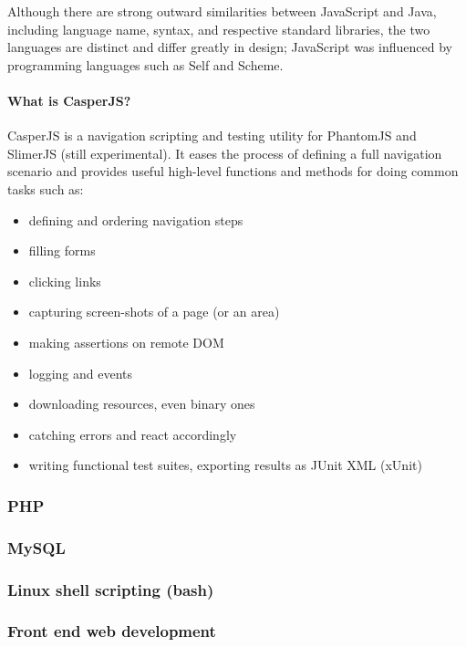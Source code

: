 \documentclass{article}
\begin{document}
Although there are strong outward similarities between JavaScript and Java, including language name, syntax, and respective standard libraries, the two languages are distinct and differ greatly in design; JavaScript was influenced by programming languages such as Self and Scheme.
	
\paragraph{What is CasperJS?}
CasperJS is a navigation scripting and testing utility for PhantomJS and SlimerJS (still experimental). It eases the process of defining a full navigation scenario and provides useful high-level functions and methods for doing common tasks such as:
\begin{itemize}
	\item defining and ordering navigation steps
	\item filling forms
	\item clicking links
	\item capturing screen-shots of a page (or an area)
	\item making assertions on remote DOM		
	\item logging and events
	\item downloading resources, even binary ones
	\item catching errors and react accordingly
	\item writing functional test suites, exporting results as JUnit XML (xUnit)
\end{itemize}
\begin{center}
					
\end{center}
	
\subsubsection{PHP}
\subsubsection{MySQL}
\subsubsection{Linux shell scripting (bash)}
\subsubsection{Front end web development}
	
	
\end{document}
